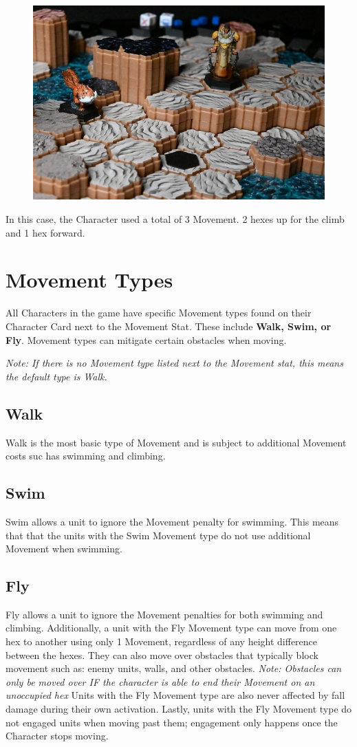 \documentclass[../main.tex]{subfiles}
\begin{document}
\begin{figure}[h]
    \centering
    \includegraphics[width=0.75\linewidth]{chapters//Movement/TimeStrikeClimbing2.jpg}
\end{figure}

In this case, the Character used a total of 3 Movement. 2 hexes up for the climb and 1 hex forward.

\section{Movement Types}
All Characters in the game have specific Movement types found on their Character Card next to the Movement Stat. These include \textbf{Walk, Swim, or Fly}. Movement types can mitigate certain obstacles when moving. 

\textit{Note: If there is no Movement type listed next to the Movement stat, this means the default type is Walk. }
\subsection{Walk}
Walk is the most basic type of Movement and is subject to additional Movement costs suc has swimming and climbing. 

\subsection{Swim}
Swim allows a unit to ignore the Movement penalty for swimming. This means that that the units with the Swim Movement type do not use additional Movement when swimming. 

\subsection{Fly}
Fly allows a unit to ignore the Movement penalties for both swimming and climbing. Additionally, a unit with the Fly Movement type can move from one hex to another using only 1 Movement, regardless of any height difference between the hexes. They can also move over obstacles that typically block movement such as: enemy units, walls, and other obstacles. \textit{Note: Obstacles can only be moved over IF the character is able to end their Movement on an unoccupied hex} Units with the Fly Movement type are also never affected by fall damage during their own activation. Lastly, units with the Fly Movement type do not engaged units when moving past them; engagement only happens once the Character stops moving. 
\end{document}
